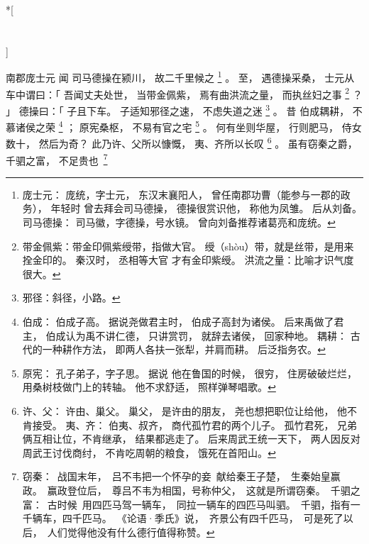 
\switchcolumn[0]*[\section{}]

南郡庞士元
闻
司马德操在颍川，
故二千里候之%
\footnote{%
    庞士元：
        庞统，字士元，
        东汉末襄阳人，
        曾任南郡功曹（能参与一郡的政务），
        年轻时
        曾去拜会司马德操，
        德操很赏识他，
        称他为凤雏。
        后从刘备。
    司马德操：
        司马徽，字德操，号水镜。
        曾向刘备推荐诸葛亮和庞统。
}%
。
至，
遇德操采桑，
士元从车中谓曰：「
    吾闻丈夫处世，
    当带金佩紫，
    焉有曲洪流之量，
    而执丝妇之事%
    \footnote{%
        带金佩紫：带金印佩紫绶带，指做大官。
                  绶（shòu）带，就是丝带，是用来拴金印的。
                  秦汉时，
                  丞相等大官
                  才有金印紫绶。
        洪流之量：比喻才识气度很大。
    }%
    ？
」
德操曰：「
    子且下车。
    子适知邪径之速，
      不虑失道之迷%
      \footnote{%
          邪径：斜径，小路。
      }%
      。
    昔
    伯成耦耕，
    不慕诸侯之荣%
    \footnote{%
        伯成：
            伯成子高。
            据说尧做君主时，
            伯成子高封为诸侯。
            后来禹做了君主，
            伯成认为禹不讲仁德，
            只讲赏罚，
            就辞去诸侯，
            回家种地。
        耦耕：
            古代的一种耕作方法，
            即两人各扶一张犁，并肩而耕。
            后泛指务农。
    }%
    ；
    原宪桑枢，
    不易有官之宅%
    \footnote{%
        原宪：
            孔子弟子，字子思。
            据说
            他在鲁国的时候，
            很穷，
            住房破破烂烂，用桑树枝做门上的转轴。
            他不求舒适，
            照样弹琴唱歌。
    }%
    。
    何有坐则华屋，
        行则肥马，
        侍女数十，
    然后为奇？
    此乃许、父所以慷慨，
        夷、齐所以长叹%
        \footnote{%
            许、父：
                许由、巢父。
                巢父，
                是许由的朋友，
                尧也想把职位让给他，
                他不肯接受。
            夷、齐：
                伯夷、叔齐，
                商代孤竹君的两个儿子。
                孤竹君死，
                兄弟俩互相让位，不肯继承，
                结果都逃走了。
                后来周武王统一天下，
                两人因反对周武王讨伐商纣，
                不肯吃周朝的粮食，
                饿死在首阳山。
        }%
        。
    虽有窃秦之爵，
    千驷之富，
    不足贵\mbox{也%
    \footnote{%
        窃秦：
            战国末年，
            吕不韦把一个怀孕的妾
            献给秦王子楚，
            生秦始皇赢政。
            赢政登位后，
            尊吕不韦为相国，号称仲父，
            这就是所谓窃秦。
        千驷之富：
            古时候
            用四匹马驾一辆车，
            同拉一辆车的四匹马叫驷。
            千驷，指有一千辆车，四千匹马。
            《论语·季氏》说，
            齐景公有四千匹马，
            可是死了以后，
            人们觉得他没有什么德行值得称赞。
    }}%
